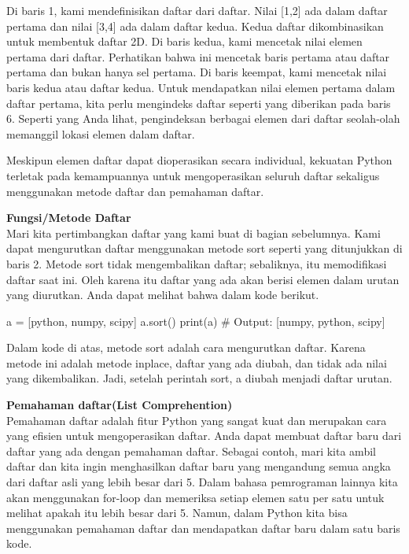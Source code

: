 \documentclass[
  letterpaper,
  DIV=11,
  numbers=noendperiod]{scrreprt}
\newenvironment{Shaded}{\begin{snugshade}}{\end{snugshade}}
\newcommand{\BuiltInTok}[1]{\textcolor[rgb]{0.00,0.23,0.31}{#1}}
\newcommand{\CommentTok}[1]{\textcolor[rgb]{0.37,0.37,0.37}{#1}}
\newcommand{\NormalTok}[1]{\textcolor[rgb]{0.00,0.23,0.31}{#1}}
\newcommand{\OperatorTok}[1]{\textcolor[rgb]{0.37,0.37,0.37}{#1}}
\newcommand{\StringTok}[1]{\textcolor[rgb]{0.13,0.47,0.30}{#1}}
\begin{document}
Di baris 1, kami mendefinisikan daftar dari daftar. Nilai {[}1,2{]} ada
dalam daftar pertama dan nilai {[}3,4{]} ada dalam daftar kedua. Kedua
daftar dikombinasikan untuk membentuk daftar 2D. Di baris kedua, kami
mencetak nilai elemen pertama dari daftar. Perhatikan bahwa ini mencetak
baris pertama atau daftar pertama dan bukan hanya sel pertama. Di baris
keempat, kami mencetak nilai baris kedua atau daftar kedua. Untuk
mendapatkan nilai elemen pertama dalam daftar pertama, kita perlu
mengindeks daftar seperti yang diberikan pada baris 6. Seperti yang Anda
lihat, pengindeksan berbagai elemen dari daftar seolah-olah memanggil
lokasi elemen dalam daftar.

Meskipun elemen daftar dapat dioperasikan secara individual, kekuatan
Python terletak pada kemampuannya untuk mengoperasikan seluruh daftar
sekaligus menggunakan metode daftar dan pemahaman daftar.

\textbf{Fungsi/Metode Daftar}\\
Mari kita pertimbangkan daftar yang kami buat di bagian sebelumnya. Kami
dapat mengurutkan daftar menggunakan metode sort seperti yang
ditunjukkan di baris 2. Metode sort tidak mengembalikan daftar;
sebaliknya, itu memodifikasi daftar saat ini. Oleh karena itu daftar
yang ada akan berisi elemen dalam urutan yang diurutkan. Anda dapat
melihat bahwa dalam kode berikut.

\begin{Shaded}
\begin{Highlighting}[]
\NormalTok{a }\OperatorTok{=}\NormalTok{ [}\StringTok{\textquotesingle{}python\textquotesingle{}}\NormalTok{, }\StringTok{\textquotesingle{}numpy\textquotesingle{}}\NormalTok{, }\StringTok{\textquotesingle{}scipy\textquotesingle{}}\NormalTok{]}
\NormalTok{a.sort()}
\BuiltInTok{print}\NormalTok{(a)}
\CommentTok{\# Output: [\textquotesingle{}numpy\textquotesingle{}, \textquotesingle{}python\textquotesingle{}, \textquotesingle{}scipy\textquotesingle{}]}
\end{Highlighting}
\end{Shaded}

Dalam kode di atas, metode sort adalah cara mengurutkan daftar. Karena
metode ini adalah metode inplace, daftar yang ada diubah, dan tidak ada
nilai yang dikembalikan. Jadi, setelah perintah sort, a diubah menjadi
daftar urutan.

\textbf{Pemahaman daftar(List Comprehention)}\\
Pemahaman daftar adalah fitur Python yang sangat kuat dan merupakan cara
yang efisien untuk mengoperasikan daftar. Anda dapat membuat daftar baru
dari daftar yang ada dengan pemahaman daftar. Sebagai contoh, mari kita
ambil daftar dan kita ingin menghasilkan daftar baru yang mengandung
semua angka dari daftar asli yang lebih besar dari 5. Dalam bahasa
pemrograman lainnya kita akan menggunakan for-loop dan memeriksa setiap
elemen satu per satu untuk melihat apakah itu lebih besar dari 5. Namun,
dalam Python kita bisa menggunakan pemahaman daftar dan mendapatkan
daftar baru dalam satu baris kode.
\end{document}
